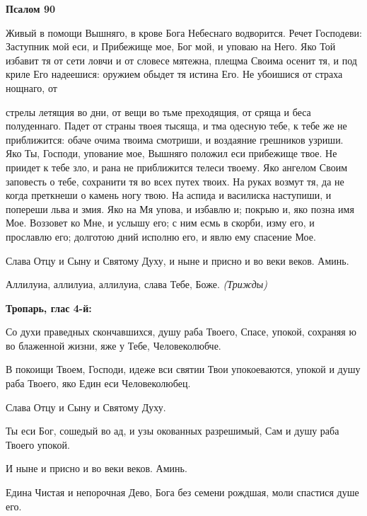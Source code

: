  

\bfseries Псалом 90\normalfont{}


   Живый в помощи Вышняго, в крове Бога Небеснаго водворится.
Речет Господеви: Заступник мой еси, и Прибежище мое, Бог мой,
и уповаю на Него. Яко Той избавит тя от сети ловчи и от словесе
мятежна, плещма Своима осенит тя, и под криле Его надеешися:
оружием обыдет тя истина Его. Не убоишися от страха нощнаго, от

стрелы летящия во дни, от вещи во тьме преходящия, от сряща и беса
полуденнаго. Падет от страны твоея тысяща, и тма одесную тебе, к
тебе же не приближится: обаче очима твоима смотриши, и воздаяние
грешников узриши. Яко Ты, Господи, упование мое, Вышняго положил еси
прибежище твое. Не приидет к тебе зло, и рана не приближится телеси
твоему. Яко ангелом Своим заповесть о тебе, сохранити тя во всех
путех твоих. На руках возмут тя, да не когда преткнеши о камень
ногу твою. На аспида и василиска наступиши, и попереши льва и
змия. Яко на Мя упова, и избавлю и; покрыю и, яко позна имя Мое.
Воззовет ко Мне, и услышу его; с ним есмь в скорби, изму его, и
прославлю его; долготою дний исполню его, и явлю ему спасение
Мое.



   Слава Отцу и Сыну и Святому Духу, и ныне и присно и во веки веков.
Аминь.



   Аллилуиа, аллилуиа, аллилуиа, слава Тебе, Боже. \itshape (Трижды)\normalfont{}



 

\bfseries Тропарь, глас 4-й:\normalfont{}


   Со духи праведных скончавшихся, душу раба Твоего, Спасе, упокой,
сохраняя ю во блаженной жизни, яже у Тебе, Человеколюбче.



   В покоищи Твоем, Господи, идеже вси святии Твои упокоеваются, упокой
и душу раба Твоего, яко Един еси Человеколюбец.



   Слава Отцу и Сыну и Святому Духу.



   Ты еси Бог, сошедый во ад, и узы окованных разрешимый, Сам и душу
раба Твоего упокой.



   И ныне и присно и во веки веков. Аминь.



   Едина Чистая и непорочная Дево, Бога без семени рождшая, моли
спастися душе его.



